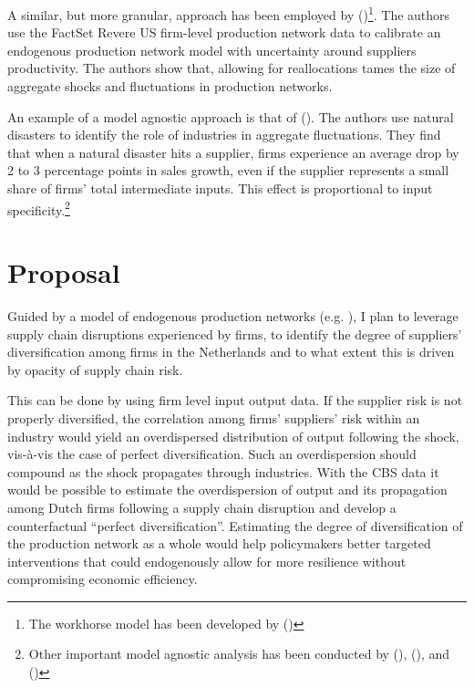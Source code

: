 \documentclass[american, abstract=on]{scrartcl}
\newcommand{\citein}[1]{\citeauthor{#1} (\citeyear{#1})}
\begin{document}
A similar, but more granular, approach has been employed by \citein{mathieu_taschereau-dumouchel_cascades_2020}\footnote{The workhorse model has been developed by \citein{acemoglu_endogenous_2020}}. The authors use the FactSet Revere US firm-level production network data to calibrate an endogenous production network model with uncertainty around suppliers productivity. The authors show that, allowing for reallocations tames the size of aggregate shocks and fluctuations in production networks.

An example of a model agnostic approach is that of \citein{barrot_input_2016}. The authors use natural disasters to identify the role of industries in aggregate fluctuations. They find that when a natural disaster hits a supplier, firms experience an average drop by 2 to 3 percentage points in sales growth, even if the supplier represents a small share of firms' total intermediate inputs. This effect is proportional to input specificity.\footnote{Other important model agnostic analysis has been conducted by \citein{luttmer_selection_2007}, \citein{atalay_network_2011}, and \citein{mackay_how_2020}}

\section{Proposal}

Guided by a model of endogenous production networks (e.g. \cite{kopytov_endogenous_2021,elliott_supply_2022}), I plan to leverage supply chain disruptions experienced by firms, to identify the degree of suppliers' diversification among firms in the Netherlands and to what extent this is driven by opacity of supply chain risk.

This can be done by using firm level input output data. If the supplier risk is not properly diversified, the correlation among firms' suppliers' risk within an industry would yield an overdispersed distribution of output following the shock, vis-à-vis the case of perfect diversification. Such an overdispersion should compound as the shock propagates through industries. With the CBS data it would be possible to estimate the overdispersion of output and its propagation among Dutch firms following a supply chain disruption and develop a counterfactual ``perfect diversification''. Estimating the degree of diversification of the production network as a whole would help policymakers better targeted interventions that could endogenously allow for more resilience without compromising economic efficiency.
\end{document}
